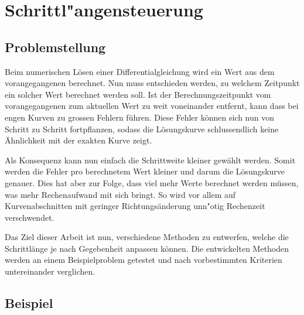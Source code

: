 \chapter{Schrittl"angensteuerung\label{chapter:thema}}
\begin{refsection}
\printbibliography[heading=subbibliography]


\section{Problemstellung}


Beim numerischen Lösen einer Differentialgleichung wird ein Wert aus dem vorangegangenen berechnet.
Nun muss entschieden werden, zu welchem Zeitpunkt ein solcher Wert berechnet werden soll.
Ist der Berechnungszeitpunkt vom vorangegangenen zum aktuellen Wert zu weit voneinander entfernt, kann dass bei engen Kurven zu grossen Fehlern führen.
Diese Fehler können sich nun von Schritt zu Schritt fortpflanzen, sodass die Lösungskurve schlussendlich keine Ähnlichkeit mit der exakten Kurve zeigt.

Als Konsequenz kann nun einfach die Schrittweite kleiner gewählt werden.
Somit werden die Fehler pro berechnetem Wert kleiner und darum die Lösungskurve genauer.
Dies hat aber zur Folge, dass viel mehr Werte berechnet werden müssen, was mehr Rechenaufwand mit sich bringt.
So wird vor allem auf Kurvenabschnitten mit geringer Richtungsänderung unn"otig Rechenzeit verschwendet.

Das Ziel dieser Arbeit ist nun, verschiedene Methoden zu entwerfen, welche die Schrittlänge je nach Gegebenheit anpassen können. 
Die entwickelten Methoden werden an einem Beispielproblem getestet und nach vorbestimmten Kriterien untereinander verglichen.


\section{Beispiel}


\end{refsection}
